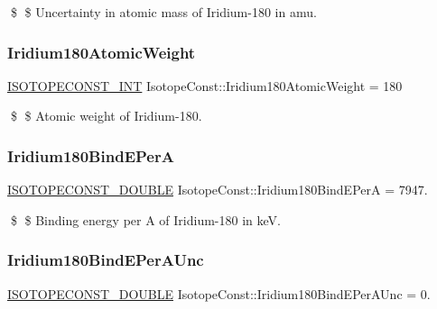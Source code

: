 \$ \$ Uncertainty in atomic mass of Iridium-\/180 in amu. \mbox{\label{group___isotope_const-_iridium-_ir180_gac11745b844fd262f9eeb8c68da055c59}} 
\subsubsection{\texorpdfstring{Iridium180\+Atomic\+Weight}{Iridium180AtomicWeight}}
{\footnotesize\ttfamily \mbox{\hyperlink{group___isotope_const-_macros_ga5f18360b3e99483a35c32d789e62621c}{I\+S\+O\+T\+O\+P\+E\+C\+O\+N\+S\+T\+\_\+\+I\+NT}} Isotope\+Const\+::\+Iridium180\+Atomic\+Weight = 180}

\$ \$ Atomic weight of Iridium-\/180. \mbox{\label{group___isotope_const-_iridium-_ir180_ga04f607595085bdb71da0f6f5829b9472}} 
\subsubsection{\texorpdfstring{Iridium180\+Bind\+E\+PerA}{Iridium180BindEPerA}}
{\footnotesize\ttfamily \mbox{\hyperlink{group___isotope_const-_macros_ga8f45a7272ce02c0b4c65c44636ed719a}{I\+S\+O\+T\+O\+P\+E\+C\+O\+N\+S\+T\+\_\+\+D\+O\+U\+B\+LE}} Isotope\+Const\+::\+Iridium180\+Bind\+E\+PerA = 7947.}

\$ \$ Binding energy per A of Iridium-\/180 in keV. \mbox{\label{group___isotope_const-_iridium-_ir180_gaa332dd8ec3a0de77507fbfd1b1cc463e}} 
\subsubsection{\texorpdfstring{Iridium180\+Bind\+E\+Per\+A\+Unc}{Iridium180BindEPerAUnc}}
{\footnotesize\ttfamily \mbox{\hyperlink{group___isotope_const-_macros_ga8f45a7272ce02c0b4c65c44636ed719a}{I\+S\+O\+T\+O\+P\+E\+C\+O\+N\+S\+T\+\_\+\+D\+O\+U\+B\+LE}} Isotope\+Const\+::\+Iridium180\+Bind\+E\+Per\+A\+Unc = 0.}

